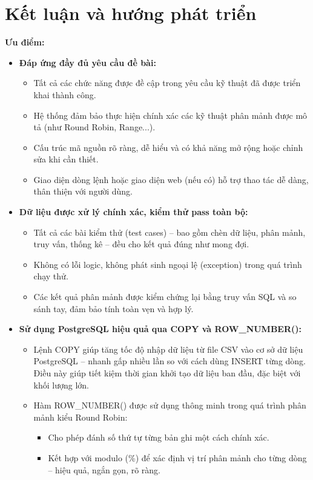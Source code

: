 \documentclass[14pt]{extarticle}
\begin{document}
\clearpage
\section{Kết luận và hướng phát triển}
\textbf{Ưu điểm:}
\begin{itemize}
    \item \textbf{Đáp ứng đầy đủ yêu cầu đề bài:}
    \begin{itemize}
        \item Tất cả các chức năng được đề cập trong yêu cầu kỹ thuật đã được triển khai thành công.
        \item Hệ thống đảm bảo thực hiện chính xác các kỹ thuật phân mảnh được mô tả (như Round Robin, Range...).
        \item Cấu trúc mã nguồn rõ ràng, dễ hiểu và có khả năng mở rộng hoặc chỉnh sửa khi cần thiết.
        \item Giao diện dòng lệnh hoặc giao diện web (nếu có) hỗ trợ thao tác dễ dàng, thân thiện với người dùng.
    \end{itemize}
    \item \textbf{Dữ liệu được xử lý chính xác, kiểm thử pass toàn bộ:}
    \begin{itemize}
        \item Tất cả các bài kiểm thử (test cases) – bao gồm chèn dữ liệu, phân mảnh, truy vấn, thống kê – đều cho kết quả đúng như mong đợi.
        \item Không có lỗi logic, không phát sinh ngoại lệ (exception) trong quá trình chạy thử.
        \item Các kết quả phân mảnh được kiểm chứng lại bằng truy vấn SQL và so sánh tay, đảm bảo tính toàn vẹn và hợp lý.
    \end{itemize}
    \item \textbf{Sử dụng PostgreSQL hiệu quả qua COPY và ROW\_NUMBER():}
    \begin{itemize}
        \item Lệnh COPY giúp tăng tốc độ nhập dữ liệu từ file CSV vào cơ sở dữ liệu PostgreSQL – nhanh gấp nhiều lần so với cách dùng INSERT từng dòng. Điều này giúp tiết kiệm thời gian khởi tạo dữ liệu ban đầu, đặc biệt với khối lượng lớn.
        \item Hàm ROW\_NUMBER() được sử dụng thông minh trong quá trình phân mảnh kiểu Round Robin:
        \begin{itemize}
            \item Cho phép đánh số thứ tự từng bản ghi một cách chính xác.
            \item Kết hợp với modulo (\%) để xác định vị trí phân mảnh cho từng dòng – hiệu quả, ngắn gọn, rõ ràng.
        \end{itemize}
    \end{itemize}
\end{itemize}
\end{document}
